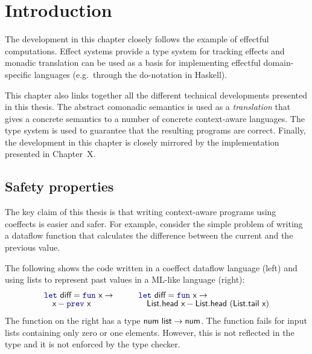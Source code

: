 \section{Introduction}
\label{sec:transl-intro}

The development in this chapter closely follows the example of effectful computations. 
Effect systems provide a type system for tracking effects and monadic translation can be used as 
a basis for implementing effectful domain-specific languages (e.g.~through the do-notation in 
Haskell). 

This chapter also links together all the different technical developments presented in this thesis.
The abstract comonadic semantics is used as a \emph{translation} that gives a concrete semantics
to a number of concrete context-aware languages. The type system is used to guarantee that the
resulting programs are correct. Finally, the development in this chapter is closely mirrored by 
the implementation presented in Chapter~X.

\subsection{Safety properties}
The key claim of this thesis is that writing context-aware programs using coeffects is easier and
safer. For example, consider the simple problem of writing a dataflow function that calculates the 
difference between the current and the previous value. 

The following shows the code written in a coeffect dataflow language (left) and using lists to
represent past values in a ML-like language (right):
%
\begin{equation*}
\begin{array}{l}
\kvd{let}~\ident{diff}=\kvd{fun}~\ident{x}\rightarrow\\[-0.2em]
 \quad \ident{x}-\kvd{prev}~\ident{x}
\end{array} 
\qquad
\begin{array}{l}
\kvd{let}~\ident{diff}=\kvd{fun}~\ident{x}\rightarrow\\[-0.2em]
 \quad \ident{List.head}~\ident{x}-\ident{List.head}~(\ident{List.tail}~\ident{x})
\end{array} 
\end{equation*}
%
The function on the right has a type $\textnormal{\sffamily num}~\textnormal{\sffamily list}\rightarrow\textnormal{\sffamily num}$. The function
fails for input lists containing only zero or one elements. However, this is not reflected in the
type and it is not enforced by the type checker.

